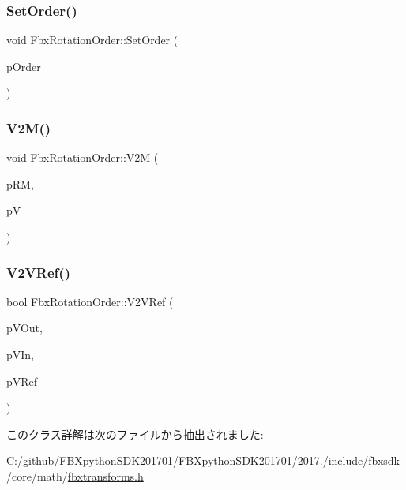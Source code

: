 \mbox{\label{class_fbx_rotation_order_ac6269a975333f6cdc9d34630d0afed79}} 
\subsubsection{\texorpdfstring{Set\+Order()}{SetOrder()}}
{\footnotesize\ttfamily void Fbx\+Rotation\+Order\+::\+Set\+Order (\begin{DoxyParamCaption}\item[{\hyperlink{class_fbx_euler_a7d5bec7eedb022b4dae56894ab7a9939}{Fbx\+Euler\+::\+E\+Order}}]{p\+Order }\end{DoxyParamCaption})}

\mbox{\label{class_fbx_rotation_order_a51aaffe701607ad3ce75f153f8ff1965}} 
\subsubsection{\texorpdfstring{V2\+M()}{V2M()}}
{\footnotesize\ttfamily void Fbx\+Rotation\+Order\+::\+V2M (\begin{DoxyParamCaption}\item[{\hyperlink{class_fbx_a_matrix}{Fbx\+A\+Matrix} \&}]{p\+RM,  }\item[{const \hyperlink{class_fbx_vector4}{Fbx\+Vector4} \&}]{pV }\end{DoxyParamCaption})}

\mbox{\label{class_fbx_rotation_order_ae06483cd7b2d959fd38c55135879a2cf}} 
\subsubsection{\texorpdfstring{V2\+V\+Ref()}{V2VRef()}}
{\footnotesize\ttfamily bool Fbx\+Rotation\+Order\+::\+V2\+V\+Ref (\begin{DoxyParamCaption}\item[{\hyperlink{class_fbx_vector4}{Fbx\+Vector4} \&}]{p\+V\+Out,  }\item[{const \hyperlink{class_fbx_vector4}{Fbx\+Vector4} \&}]{p\+V\+In,  }\item[{const \hyperlink{class_fbx_vector4}{Fbx\+Vector4} \&}]{p\+V\+Ref }\end{DoxyParamCaption})}



このクラス詳解は次のファイルから抽出されました\+:\begin{DoxyCompactItemize}
\item 
C\+:/github/\+F\+B\+Xpython\+S\+D\+K201701/\+F\+B\+Xpython\+S\+D\+K201701/2017./include/fbxsdk/core/math/\hyperlink{fbxtransforms_8h}{fbxtransforms.\+h}\end{DoxyCompactItemize}
